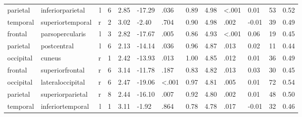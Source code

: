 \documentclass{article}
\begin{document}
\begin{longtable}{llrR{1.3cm}R{1cm}R{1.3cm}R{1cm}R{1cm}R{1.3cm}R{1cm}R{1.8cm}R{1.3cm}R{1.8cm}}
  parietal &          inferiorparietal &    l &         6 &                  2.85 &           -17.29 &               .036 &                               0.89 &                          4.98 &                   \textless.001 &   0.01 &     53 &      0.52 \\
  temporal &          superiortemporal &    r &         2 &                  3.02 &            -2.40 &               .704 &                               0.90 &                          4.98 &                            .002 &  -0.01 &     39 &      0.49 \\
   frontal &           parsopercularis &    l &         3 &                  2.82 &           -17.67 &               .005 &                               0.86 &                          4.93 &                   \textless.001 &   0.06 &     19 &      0.45 \\
  parietal &               postcentral &    l &         6 &                  2.13 &           -14.14 &               .036 &                               0.96 &                          4.87 &                            .013 &   0.02 &     11 &      0.44 \\
 occipital &                    cuneus &    r &         1 &                  2.42 &           -13.93 &               .013 &                               1.00 &                          4.85 &                            .012 &   0.01 &     36 &      0.49 \\
   frontal &           superiorfrontal &    r &         6 &                  3.14 &           -11.78 &               .187 &                               0.83 &                          4.82 &                            .013 &   0.03 &     30 &      0.45 \\
 occipital &          lateraloccipital &    r &         6 &                  2.47 &           -19.06 &      \textless.001 &                               0.97 &                          4.81 &                            .005 &   0.01 &     72 &      0.54 \\
  parietal &          superiorparietal &    r &         8 &                  2.44 &           -16.10 &               .007 &                               0.92 &                          4.80 &                            .002 &   0.01 &     48 &      0.50 \\
  temporal &          inferiortemporal &    l &         1 &                  3.11 &            -1.92 &               .864 &                               0.78 &                          4.78 &                            .017 &  -0.01 &     32 &      0.46 \\

\end{longtable}
\end{document}
